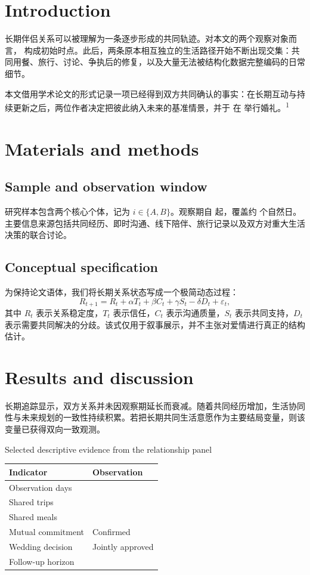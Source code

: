\documentclass[9pt,twocolumn]{extarticle}
\begin{document}
\setcounter{page}{520}
\makeJOLfrontmatter

\section{Introduction}
长期伴侣关系可以被理解为一条逐步形成的共同轨迹。对本文的两个观察对象而言，\FirstMeetingDate{} 构成初始时点。此后，两条原本相互独立的生活路径开始不断出现交集：共同用餐、旅行、讨论、争执后的修复，以及大量无法被结构化数据完整编码的日常细节。

本文借用学术论文的形式记录一项已经得到双方共同确认的事实：在长期互动与持续更新之后，两位作者决定把彼此纳入未来的基准情景，并于 \WeddingDate{} 在 \WeddingVenue{} 举行婚礼。\textsuperscript{1}

\section{Materials and methods}
\subsection{Sample and observation window}
研究样本包含两个核心个体，记为 $i\in\{A,B\}$。观察期自 \FirstMeetingDate{} 起，覆盖约 \DaysObserved{} 个自然日。主要信息来源包括共同经历、即时沟通、线下陪伴、旅行记录以及双方对重大生活决策的联合讨论。

\subsection{Conceptual specification}
为保持论文语体，我们将长期关系状态写成一个极简动态过程：
\begin{equation}
R_{t+1}=R_t+\alpha T_t+\beta C_t+\gamma S_t-\delta D_t+\varepsilon_t,
\end{equation}
其中 $R_t$ 表示关系稳定度，$T_t$ 表示信任，$C_t$ 表示沟通质量，$S_t$ 表示共同支持，$D_t$ 表示需要共同解决的分歧。该式仅用于叙事展示，并不主张对爱情进行真正的结构估计。

\clearpage
\section{Results and discussion}
长期追踪显示，双方关系并未因观察期延长而衰减。随着共同经历增加，生活协同性与未来规划的一致性持续积累。若把长期共同生活意愿作为主要结局变量，则该变量已获得双向一致观测。

\begin{JOLtable}{Selected descriptive evidence from the relationship panel}
\begin{tabularx}{\columnwidth}{@{}l>{\raggedleft\arraybackslash}X@{}}\toprule
Indicator & Observation\\\midrule
Observation days & \DaysObserved{}\\
Shared trips & \SharedTrips{}\\
Shared meals & \SharedMeals{}\\
Mutual commitment & Confirmed\\
Wedding decision & Jointly approved\\
Follow-up horizon & \FutureHorizon{}\\\bottomrule
\end{tabularx}
\end{JOLtable}
\end{document}
